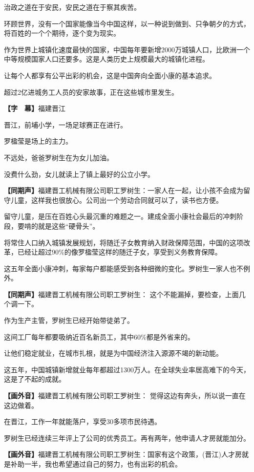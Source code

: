 \documentclass{ctexart}
\newcommand{\zkh}[1]{\textbf{\hspace{-2.7em} 【#1】}}
\begin{document}
 治政之道在于安民，安民之道在于察其疾苦。

环顾世界，没有一个国家能像当今中国这样，以一种说到做到、只争朝夕的方式，将百姓的一个个期待，逐个变为现实。

 
作为世界上城镇化速度最快的国家，中国每年要新增2000万城镇人口，比欧洲一个中等规模国家人口还要多。这是人类历史上规模最大的城镇化进程。

 让每个人都享有公平出彩的机会，这是中国奔向全面小康的基本追求。

 超过2亿进城务工人员的安家故事，正在这些城市里发生。

 \zkh{字　幕}福建晋江

 晋江，前埔小学，一场足球赛正在进行。

 罗楹莹是场上的主力。

 不远处，爸爸罗树生在为女儿加油。

 没费什么劲，女儿就读上了镇上最好的公立小学。

 \zkh{同期声}福建晋工机械有限公司职工罗树生：一家人在一起，让小孩不会成为留守儿童，这样我也很放心。公司出一个劳动合同就可以了，读书也方便。

 
留守儿童，是压在百姓心头最沉重的难题之一。建成全面小康社会最后的冲刺阶段，要啃的就是这些``硬骨头''。

将常住人口纳入城镇发展规划，将随迁子女教育纳入财政保障范围，中国的这项改革，已经让超过90{\%}的像罗楹莹这样的随迁子女，享受到义务教育保障。

这五年全面小康冲刺，每家每户都能感受到各种细微的变化。罗树生一家人也不例外。

 \zkh{同期声}福建晋工机械有限公司职工罗树生： 这个不能漏掉，要检查，上面几个调一下。

 作为生产主管，罗树生已经开始带徒弟了。

 这间工厂每年都要吸纳近百名新员工，其中60{\%}都是外省来的。

 让他们稳定就业，在城市扎根，就是为中国经济注入源源不竭的新动能。

这五年，中国城镇新增就业每年都超过1300万人。在全球失业率居高难下的今天，这是了不起的成就。

 \zkh{画外音}福建晋工机械有限公司职工罗树生： 觉得这边有奔头，所以说一直在这边做着。

 在晋江，工作一年就能落户，享受30多项市民待遇。

 罗树生已经连续三年评上了公司的优秀员工。再有两年，他申请人才房就能加分。

 \zkh{画外音}福建晋工机械有限公司职工罗树生：国家有这个政策，(晋江)人才房就是补助一半，我也希望通过自己的努力，也有出彩的机会。
\end{document}
